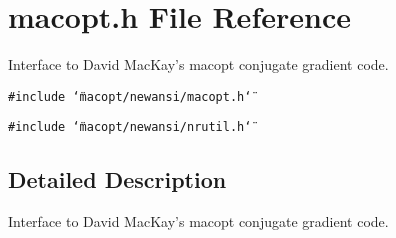 \section{macopt.h File Reference}
\label{macopt_8h}
Interface to David Mac\-Kay's macopt conjugate gradient code.  


{\tt \#include \char`\"{}macopt/newansi/macopt.h\char`\"{}}\par
{\tt \#include \char`\"{}macopt/newansi/nrutil.h\char`\"{}}\par


\subsection{Detailed Description}
Interface to David Mac\-Kay's macopt conjugate gradient code. 

